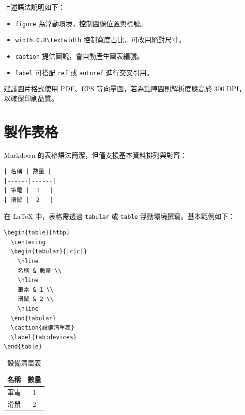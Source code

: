 

上述語法說明如下：

\begin{itemize}
  \item \texttt{figure} 為浮動環境，控制圖像位置與標號。
  \item \texttt{width=0.8\textbackslash textwidth} 控制寬度占比，可改用絕對尺寸。
  \item \texttt{caption} 提供圖說，會自動產生圖表編號。
  \item \texttt{label} 可搭配 \texttt{ref} 或 \texttt{autoref} 進行交叉引用。
\end{itemize}

建議圖片格式使用 PDF、EPS 等向量圖，若為點陣圖則解析度應高於 300 DPI，以確保印刷品質。

\section{製作表格}

Markdown 的表格語法簡潔，但僅支援基本資料排列與對齊：

\begin{verbatim}
| 名稱 | 數量 |
|------|------|
| 筆電 |  1   |
| 滑鼠 |  2   |
\end{verbatim}

在 LaTeX 中，表格需透過 \texttt{tabular} 或 \texttt{table} 浮動環境撰寫。基本範例如下：

\begin{verbatim}
\begin{table}[htbp]
  \centering
  \begin{tabular}{|c|c|}
    \hline
    名稱 & 數量 \\
    \hline
    筆電 & 1 \\
    滑鼠 & 2 \\
    \hline
  \end{tabular}
  \caption{設備清單表}
  \label{tab:devices}
\end{table}
\end{verbatim}

\begin{table}[htbp]
  \centering
  \begin{tabular}{|c|c|}
    \hline
    名稱 & 數量 \\
    \hline
    筆電 & 1 \\
    滑鼠 & 2 \\
    \hline
  \end{tabular}
  \caption{設備清單表}
  \label{tab:devices}
\end{table}

